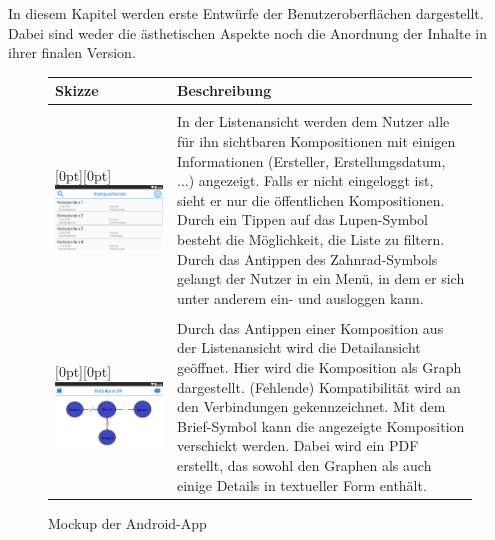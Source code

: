 In diesem Kapitel werden erste Entwürfe der Benutzeroberflächen dargestellt. Dabei sind weder die ästhetischen Aspekte noch die Anordnung der Inhalte in ihrer finalen Version.

\begin{figure}[h]
	\centering

	\begin{tabularx}{\textwidth}{ p{} | X }
		\textbf{Skizze} & \textbf{Beschreibung}

		\\ \hline \\

		\raisebox{-.9\height}[0pt][0pt]{\includegraphics[width=.5\textwidth]{img/mockup_list}}
		\label{fig:mock-list}

		&In der Listenansicht werden dem Nutzer alle für ihn sichtbaren Kompositionen mit einigen Informationen (Ersteller, Erstellungsdatum, ...) angezeigt. Falls er nicht eingeloggt ist, sieht er nur die öffentlichen Kompositionen. Durch ein Tippen auf das Lupen-Symbol besteht die Möglichkeit, die Liste zu filtern. Durch das Antippen des Zahnrad-Symbols gelangt der Nutzer in ein Menü, in dem er sich unter anderem ein- und ausloggen kann.

		\\ \hline \\
		\raisebox{-.9\height}[0pt][0pt]{\includegraphics[width=.5\textwidth]{img/mockup_detail}}
		\label{fig:mock-detail}

		&
		Durch das Antippen einer Komposition aus der Listenansicht wird die Detailansicht geöffnet. Hier wird die Komposition als Graph dargestellt. (Fehlende) Kompatibilität wird an den Verbindungen gekennzeichnet. Mit dem Brief-Symbol kann die angezeigte Komposition verschickt werden.  Dabei wird ein PDF erstellt, das sowohl den Graphen als auch einige Details in textueller Form enthält.

	\end{tabularx}

	\caption{Mockup der Android-App}
	\label{fig:app-mockup}
\end{figure}


